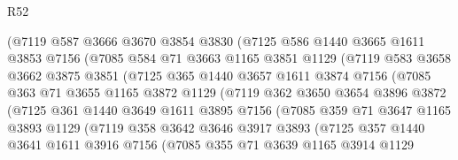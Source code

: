 \begin{lexlean}{R52}
\begin{coremodule}
              (@7119
                @587
                @3666
                @3670
                @3854
                @3830
                (@7125
                  @586
                  @1440
                  @3665
                  @1611
                  @3853
                  @7156
                  (@7085
                    @584
                    @71
                    @3663
                    @1165
                    @3851
                    @1129
                    (@7119
                      @583
                      @3658
                      @3662
                      @3875
                      @3851
                      (@7125
                        @365
                        @1440
                        @3657
                        @1611
                        @3874
                        @7156
                        (@7085
                          @363
                          @71
                          @3655
                          @1165
                          @3872
                          @1129
                          (@7119
                            @362
                            @3650
                            @3654
                            @3896
                            @3872
                            (@7125
                              @361
                              @1440
                              @3649
                              @1611
                              @3895
                              @7156
                              (@7085
                                @359
                                @71
                                @3647
                                @1165
                                @3893
                                @1129
                                (@7119
                                  @358
                                  @3642
                                  @3646
                                  @3917
                                  @3893
                                  (@7125
                                    @357
                                    @1440
                                    @3641
                                    @1611
                                    @3916
                                    @7156
                                    (@7085
                                      @355
                                      @71
                                      @3639
                                      @1165
                                      @3914
                                      @1129

\end{coremodule}
\end{lexlean}
